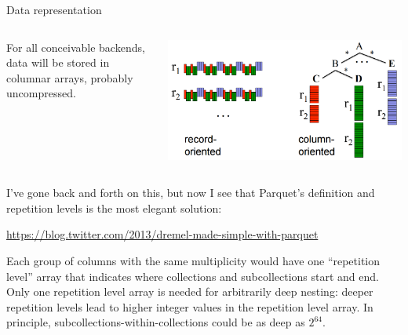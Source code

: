 \documentclass{beamer}
\begin{document}
\begin{frame}{Data representation}
\vspace{0.5 cm}
\begin{columns}
For all conceivable backends, data will be stored in columnar arrays, probably uncompressed.

\includegraphics[width=\linewidth]{columnar.png}
\end{columns}

\vspace{0.5 cm}
I've gone back and forth on this, but now I see that Parquet's definition and repetition levels is the most elegant solution:
\begin{center}
\textcolor{blue}{\scriptsize\url{https://blog.twitter.com/2013/dremel-made-simple-with-parquet}}
\end{center}

\vspace{0.5 cm}
Each group of columns with the same multiplicity would have one ``repetition level'' array that indicates where collections and subcollections start and end. Only one repetition level array is needed for arbitrarily deep nesting: deeper repetition levels lead to higher integer values in the repetition level array. In principle, subcollections-within-collections could be as deep as $2^{64}$.
\end{frame}
\end{document}
